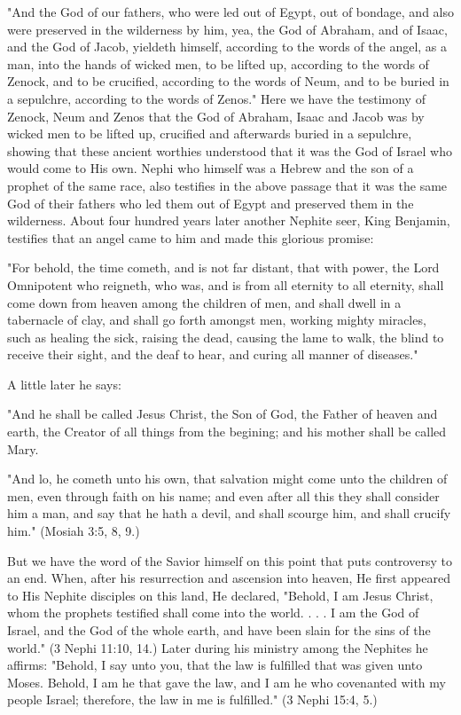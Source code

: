 "And the God of our fathers, who were led out of Egypt, out of bondage, and also were
preserved in the wilderness by him, yea, the God of Abraham, and of Isaac, and the God of
Jacob, yieldeth himself, according to the words of the angel, as a man, into the hands of
wicked men, to be lifted up, according to the words of Zenock, and to be crucified, according
to the words of Neum, and to be buried in a sepulchre, according to the words of Zenos."
Here we have the testimony of Zenock, Neum and Zenos that the God of Abraham, Isaac and
Jacob was by wicked men to be lifted up, crucified and afterwards buried in a sepulchre,
showing that these ancient worthies understood that it was the God of Israel who would come
to His own. Nephi who himself was a Hebrew and the son of a prophet of the same race, also
testifies in the above passage that it was the same God of their fathers who led them out of
Egypt and preserved them in the wilderness. About four hundred years later another Nephite
seer, King Benjamin, testifies that an angel came to him and made this glorious promise:

"For behold, the time cometh, and is not far distant, that with power, the Lord Omnipotent
who reigneth, who was, and is from all eternity to all eternity, shall come down from heaven
among the children of men, and shall dwell in a tabernacle of clay, and shall go forth
amongst men, working mighty miracles, such as healing the sick, raising the dead, causing
the lame to walk, the blind to receive their sight, and the deaf to hear, and curing all manner
of diseases."

A little later he says:

"And he shall be called Jesus Christ, the Son of God, the Father of heaven and earth, the
Creator of all things from the begining; and his mother shall be called Mary.

"And lo, he cometh unto his own, that salvation might come unto the children of men, even
through faith on his name; and even after all this they shall consider him a man, and say that
he hath a devil, and shall scourge him, and shall crucify him." (Mosiah 3:5, 8, 9.)

But we have the word of the Savior himself on this point that puts controversy to an end.
When, after his resurrection and ascension into heaven, He first appeared to His Nephite
disciples on this land, He declared, "Behold, I am Jesus Christ, whom the prophets testified
shall come into the world. . . . I am the God of Israel, and the God of the whole earth, and
have been slain for the sins of the world." (3 Nephi 11:10, 14.) Later during his ministry
among the Nephites he affirms: "Behold, I say unto you, that the law is fulfilled that was
given unto Moses. Behold, I am he that gave the law, and I am he who covenanted with my
people Israel; therefore, the law in me is fulfilled." (3 Nephi 15:4, 5.)

